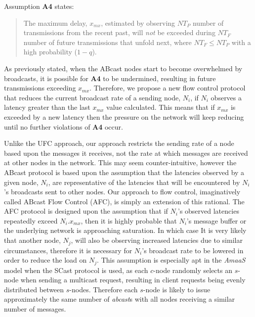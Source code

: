     Assumption \textbf{A4} states:
    
    \begin{quotation}
            The maximum delay, $x_{mx}$, estimated by observing $NT_P$ number of transmissions from the recent past, will \emph{not} be exceeded during $NT_F$ number of future transmissions that unfold next, where $NT_F \leq NT_P$ with a high probability ($1 - q$).
        \end{quotation}
    
    As previously stated, when the \textsf{ABcast} nodes start to become overwhelmed by broadcasts, it is possible for \textbf{A4} to be undermined, resulting in future transmissions exceeding $x_{mx}$.  Therefore, we propose a new flow control protocol that reduces the current broadcast rate of a sending node, $N_i$, if $N_i$ observes a latency greater than the last $x_{mx}$ value calculated.  This means that if $x_{mx}$ is exceeded by a new latency then the pressure on the network will keep reducing until no further violations of \textbf{A4} occur.  
    
    Unlike the \textsf{UFC} approach, our approach restricts the sending rate of a node based upon the messages it receives, not the rate at which messages are received at other nodes in the network.  This may seem counter-intuitive, however the \textsf{ABcast} protocol is based upon the assumption that the latencies observed by a given node, $N_i$, are representative of the latencies that will be encountered by $N_i$'s broadcasts sent to other nodes.  Our approach to flow control, imaginatively called ABcast Flow Control (AFC), is simply an extension of this rational.  The AFC protocol is designed upon the assumption that if $N_i$'s observed latencies repeatedly exceed $N_i.x_{mx}$, then it is highly probable that $N_i$'s message buffer or the underlying network is approaching saturation.  In which case It is very likely that another node, $N_j$, will also be observing increased latencies due to similar circumstances, therefore it is necessary for $N_i$'s broadcast rate to be lowered in order to reduce the load on $N_j$.  This assumption is especially apt in the \emph{AmaaS} model when the \textsf{SCast} protocol is used, as each $c$-node randomly selects an $s$-node when sending a multicast request, resulting in client requests being evenly distributed between $s$-nodes.  Therefore each $s$-node is likely to issue approximately the same number of \emph{abcast}s with all nodes receiving a similar number of messages.          
        

